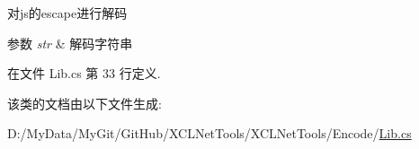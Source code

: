 对js的escape进行解码 


\begin{DoxyParams}{参数}
{\em str} & 解码字符串\\
\hline
\end{DoxyParams}


在文件 Lib.\-cs 第 33 行定义.



该类的文档由以下文件生成\-:\begin{DoxyCompactItemize}
\item 
D\-:/\-My\-Data/\-My\-Git/\-Git\-Hub/\-X\-C\-L\-Net\-Tools/\-X\-C\-L\-Net\-Tools/\-Encode/\hyperlink{_encode_2_lib_8cs}{Lib.\-cs}\end{DoxyCompactItemize}
